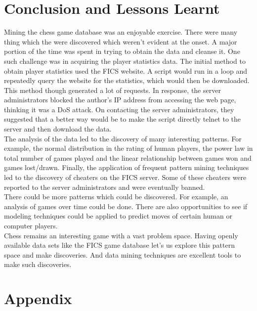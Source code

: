 \documentclass{article}
\begin{document}
\section{Conclusion and Lessons Learnt}
\label{sec:conc}

Mining the chess game database was an enjoyable exercise. There were many thing which the were discovered which weren't evident at the onset. A major portion of the time was spent in trying to obtain the data and cleanse it. One such challenge was in acquiring the player statistics data. The initial method to obtain player statistics used the FICS website. A script would run in a loop and repeatedly query the website for the statistics, which would then be downloaded. This method though generated a lot of requests. In response, the server administrators blocked the author's IP address from accessing the web page, thinking it was a DoS attack. On contacting the server administrators, they suggested that a better way would be to make the script directly telnet to the server and then download the data. \\

The analysis of the data led to the discovery of many interesting patterns. For example, the normal distribution in the rating of human players, the power law in total number of games played and the linear relationship between games won and games lost/drawn. Finally, the application of frequent pattern mining techniques led to the discovery of cheaters on the FICS server. Some of these cheaters were reported to the server administrators and were eventually banned.\\

There could be more patterns which could be discovered. For example, an analysis of games over time could be done. There are also opportunities to see if modeling techniques could be applied to predict moves of certain human or computer players. \\

Chess remains an interesting game with a vast problem space. Having openly available data sets like the FICS game database let's us explore this pattern space and make discoveries. And data mining techniques are excellent tools to make such discoveries.\\

\pagebreak
\appendix
\section{Appendix}
\end{document}
